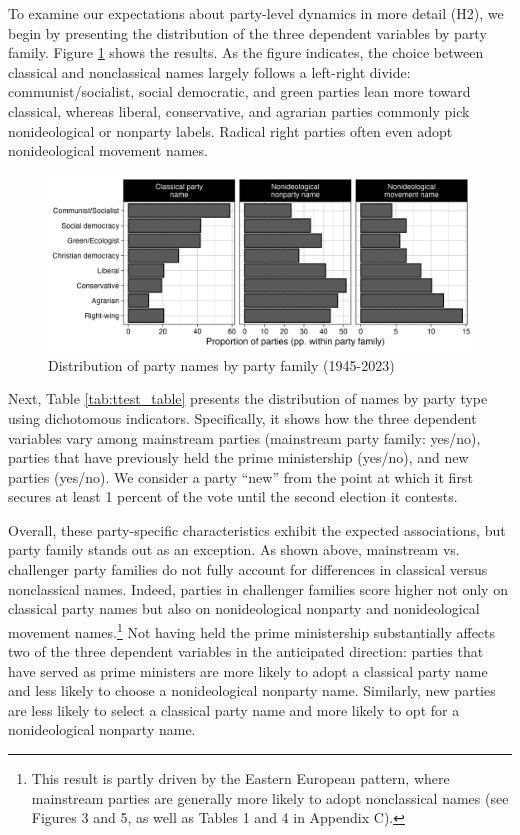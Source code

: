 \documentclass[12pt]{article}
\begin{document}
To examine our expectations about party-level dynamics in more detail (H2), we begin by presenting the distribution of the three dependent variables by party family. Figure \ref{Fig:parfam_bar} shows the results. As the figure indicates, the choice between classical and nonclassical names largely follows a left-right divide: communist/socialist, social democratic, and green parties lean more toward classical, whereas liberal, conservative, and agrarian parties commonly pick nonideological or nonparty labels. Radical right parties often even adopt nonideological movement names.

\begin{figure}[H] 
\includegraphics[width=\textwidth]{./figures/Figure3.png} 
\caption{Distribution of party names by party family (1945-2023)} 
\label{Fig:parfam_bar} 
\end{figure}

Next, Table \ref{tab:ttest_table} presents the distribution of names by party type using dichotomous indicators. Specifically, it shows how the three dependent variables vary among mainstream parties (mainstream party family: yes/no), parties that have previously held the prime ministership (yes/no), and new parties (yes/no). We consider a party ``new'' from the point at which it first secures at least 1 percent of the vote until the second election it contests.



Overall, these party-specific characteristics exhibit the expected associations, but party family stands out as an exception. As shown above, mainstream vs. challenger party families do not fully account for differences in classical versus nonclassical names. Indeed, parties in challenger families score higher not only on classical party names but also on nonideological nonparty and nonideological movement names.\footnote{This result is partly driven by the Eastern European pattern, where mainstream parties are generally more likely to adopt nonclassical names (see Figures 3 and 5, as well as Tables 1 and 4 in Appendix C).} Not having held the prime ministership substantially affects two of the three dependent variables in the anticipated direction: parties that have served as prime ministers are more likely to adopt a classical party name and less likely to choose a nonideological nonparty name. Similarly, new parties are less likely to select a classical party name and more likely to opt for a nonideological nonparty name. 
\end{document}
